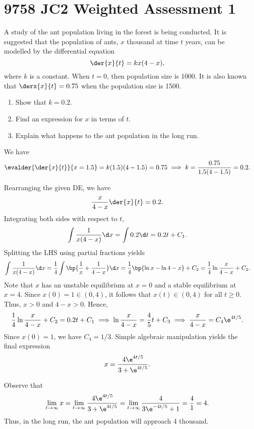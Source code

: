 \section{9758 JC2 Weighted Assessment 1}

\begin{problem}
    A study of the ant population living in the forest is being conducted. It is suggested that the population of ants, $x$ thousand at time $t$ years, can be modelled by the differential equation \[\der{x}{t} = kx(4-x),\] where $k$ is a constant. When $t = 0$, then population size is 1000. It is also known that $\derx{x}{t} = 0.75$ when the population size is 1500.

    \begin{enumerate}
        \item Show that $k = 0.2$.
        \item Find an expression for $x$ in terms of $t$.
        \item Explain what happens to the ant population in the long run.
    \end{enumerate}
\end{problem}
\begin{solution}
    \begin{ppart}
        We have \[\evalder{\der{x}{t}}{x = 1.5} = k(1.5)(4-1.5) = 0.75 \implies k = \frac{0.75}{1.5(4-1.5)} = 0.2.\]
    \end{ppart}
    \begin{ppart}
        Rearranging the given DE, we have \[\frac{x}{4-x} \der{x}{t} = 0.2.\] Integrating both sides with respect to $t$, \[\int \frac{1}{x(4-x)} \d x = \int 0.2 \d t = 0.2 t + C_1.\] Splitting the LHS using partial fractions yields \[\int \frac1{x(4-x)} \d x = \frac14 \int \bp{\frac1x + \frac1{4-x}} \d x = \frac14 \bp{\ln x - \ln{4-x}} + C_2 = \frac14 \ln \frac{x}{4-x} + C_2.\] Note that $x$ has an unstable equilibrium at $x = 0$ and a stable equilibrium at $x = 4$. Since $x(0) = 1 \in (0, 4)$, it follows that $x(t) \in (0, 4)$ for all $t \geq 0$. Thus, $x > 0$ and $4-x > 0$. Hence, \[\frac14 \ln\frac{x}{4-x} + C_2 = 0.2 t + C_1 \implies \ln \frac{x}{4-x} = \frac45 t + C_3 \implies \frac{x}{4-x} = C_4 \e^{4t/5}.\] Since $x(0) = 1$, we have $C_4 = 1/3$. Simple algebraic manipulation yields the final expression \[x = \frac{4\e^{4t/5}}{3 + \e^{4t/5}}.\]
    \end{ppart}
    \begin{ppart}
        Observe that \[\lim_{t \to \infty} x = \lim_{t \to \infty} \frac{4\e^{4t/5}}{3 + \e^{4t/5}} = \lim_{t \to \infty} \frac{4}{3\e^{-4t/5} + 1} = \frac41 = 4.\] Thus, in the long run, the ant population will approach 4 thousand.
    \end{ppart}
\end{solution}

